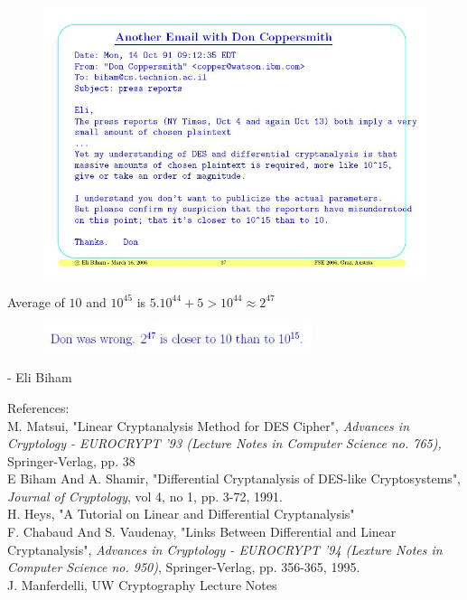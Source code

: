 \documentclass[9pt]{beamer}
\begin{document}
\begin{frame}
\begin{figure}
\includegraphics[totalheight=0.7\textheight]{coppersmith.jpg}
\end{figure}
\pause
\centerline{Average of $10$ and $10^{45}$ is $5.10^{44} + 5 > 10^{44} \approx 2^{47}$}
\pause
\begin{figure}
\includegraphics[width=0.7\textwidth]{eli.jpg}
\end{figure}
\hfill - Eli Biham
\end{frame}

\begin{frame}
References:\\
\vspace{5mm}
M. Matsui, "Linear Cryptanalysis Method for DES Cipher", \textit{Advances in Cryptology - EUROCRYPT '93 (Lecture Notes in Computer Science no. 765),} Springer-Verlag, pp. 38\\
\vspace{2mm}
E Biham And A. Shamir, "Differential Cryptanalysis of DES-like Cryptosystems", \textit{Journal of Cryptology}, vol 4, no 1, pp. 3-72, 1991.\\
\vspace{2mm}
H. Heys, "A Tutorial on Linear and Differential Cryptanalysis"\\
\vspace{2mm}
F. Chabaud And S. Vaudenay, "Links Between Differential and Linear Cryptanalysis", \textit{Advances in Cryptology - EUROCRYPT '94 (Lexture Notes in Computer Science no. 950)}, Springer-Verlag, pp. 356-365, 1995.\\
\vspace{2mm}
J. Manferdelli, UW Cryptography Lecture Notes
\end{frame}
\end{document}
